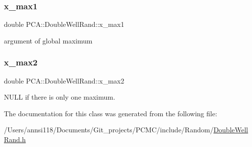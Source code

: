 \hypertarget{class_p_c_a_1_1_double_well_rand_a69b543f7eb8dda81f522a2002af65456}{}\label{class_p_c_a_1_1_double_well_rand_a69b543f7eb8dda81f522a2002af65456} 
\subsubsection{\texorpdfstring{x\+\_\+max1}{x\_max1}}
{\footnotesize\ttfamily double P\+C\+A\+::\+Double\+Well\+Rand\+::x\+\_\+max1\hspace{0.3cm}{\ttfamily [private]}}



argument of global maximum 

\hypertarget{class_p_c_a_1_1_double_well_rand_a2fd3ef155f258ef1393fdb5ae503e2b0}{}\label{class_p_c_a_1_1_double_well_rand_a2fd3ef155f258ef1393fdb5ae503e2b0} 
\subsubsection{\texorpdfstring{x\+\_\+max2}{x\_max2}}
{\footnotesize\ttfamily double P\+C\+A\+::\+Double\+Well\+Rand\+::x\+\_\+max2\hspace{0.3cm}{\ttfamily [private]}}



N\+U\+LL if there is only one maximum. 



The documentation for this class was generated from the following file\+:\begin{DoxyCompactItemize}
\item 
/\+Users/annsi118/\+Documents/\+Git\+\_\+projects/\+P\+C\+M\+C/include/\+Random/\hyperlink{_double_well_rand_8h}{Double\+Well\+Rand.\+h}\end{DoxyCompactItemize}

